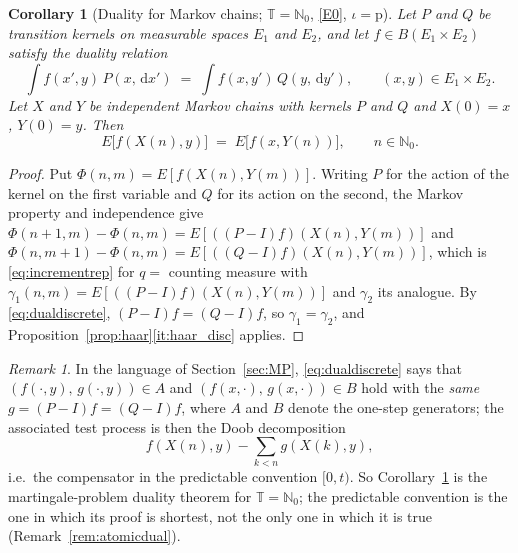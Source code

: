 \documentclass[11pt,a4paper]{article}
\theoremstyle{plain}
\newtheorem{corollary}[theorem]{Corollary}
\theoremstyle{definition}
\theoremstyle{remark}
\newtheorem{remark}[theorem]{Remark}
\newcommand{\N}{\mathbb{N}}
\newcommand{\T}{\mathbb{T}}                     %
\newcommand{\Bdd}{B}                           %
\newcommand{\dif}{\,\mathrm{d}}
\begin{document}
\begin{corollary}[Duality for Markov chains; $\T = \N_0$, \eqref{E0}, $\iota = \mathrm{p}$]
  \label{cor:dualdiscrete}
  Let $P$ and $Q$ be transition kernels on measurable spaces $E_1$ and $E_2$, and
  let $f \in \Bdd(E_1 \times E_2)$ satisfy the duality relation
  \begin{equation}
    \label{eq:dualdiscrete}
    \int f(x',y) \, P(x,\dif x') \;=\; \int f(x,y') \, Q(y,\dif y') ,
    \qquad (x,y) \in E_1 \times E_2 .
  \end{equation}
  Let $X$ and $Y$ be independent Markov chains with kernels $P$ and $Q$ and
  $X(0) = x$, $Y(0) = y$.  Then
  \begin{equation}
    \label{eq:dualdiscreteconc}
    E\bigl[ f(X(n),y) \bigr] \;=\; E\bigl[ f(x,Y(n)) \bigr] ,
    \qquad n \in \N_0 .
  \end{equation}
\end{corollary}

\begin{proof}
  Put $\Phi(n,m) = E[f(X(n),Y(m))]$.  Writing $P$ for the action of the kernel on
  the first variable and $Q$ for its action on the second, the Markov property
  and independence give
  $\Phi(n+1,m) - \Phi(n,m) = E[((P-I)f)(X(n),Y(m))]$ and
  $\Phi(n,m+1) - \Phi(n,m) = E[((Q-I)f)(X(n),Y(m))]$, which is
  \eqref{eq:incrementrep} for $q = $ counting measure with
  $\gamma_1(n,m) = E[((P-I)f)(X(n),Y(m))]$ and $\gamma_2$ its analogue.  By
  \eqref{eq:dualdiscrete}, $(P-I)f = (Q-I)f$, so $\gamma_1 = \gamma_2$, and
  Proposition~\ref{prop:haar}\ref{it:haar_disc} applies.
\end{proof}

\begin{remark}
  \label{rem:dualdiscretemp}
  In the language of Section~\ref{sec:MP}, \eqref{eq:dualdiscrete} says that
  $(f(\cdot,y),\, g(\cdot,y)) \in A$ and $(f(x,\cdot),\, g(x,\cdot)) \in B$ hold
  with the \emph{same} $g = (P-I)f = (Q-I)f$, where $A$ and $B$ denote the
  one-step generators; the associated test process is then the Doob
  decomposition
  \[
    f(X(n),y) - \sum_{k < n} g(X(k),y) ,
  \]
  i.e.\ the compensator in the predictable convention $[0,t)$.  So
  Corollary~\ref{cor:dualdiscrete} is the martingale-problem duality theorem for
  $\T = \N_0$; the predictable convention is the one in which its proof is
  shortest, not the only one in which it is true
  (Remark~\ref{rem:atomicdual}).
\end{remark}
\end{document}
